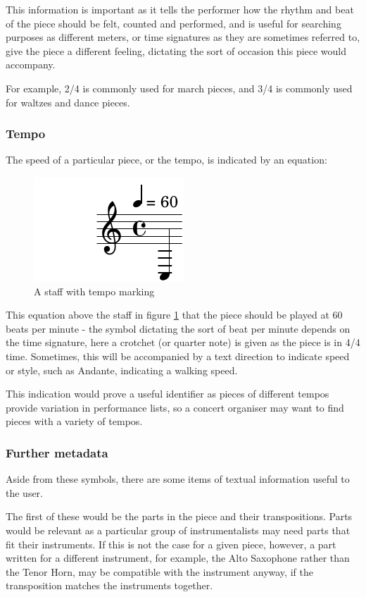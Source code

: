 This information is important as it tells the performer how the rhythm and beat of the piece should be felt, counted and performed, and is useful for searching purposes as different meters, or time signatures as they are sometimes referred to, give the piece a different feeling, dictating the sort of occasion this piece would accompany. 

For example, 2/4 is commonly used for march pieces, and 3/4 is commonly used for waltzes and dance pieces.

\subsubsection{Tempo}
The speed of a particular piece, or the tempo, is indicated by an equation:

\begin{figure}[htbp]
    \centering
        \includegraphics{tempo-crop.pdf}
    \caption{A staff with tempo marking}
    \label{fig:tempo}
\end{figure}

This equation above the staff in figure \ref{fig:tempo} that the piece should be played at 60 beats per minute - the symbol dictating the sort of beat per minute depends on the time signature, here a crotchet (or quarter note) is given as the piece is in 4/4 time. Sometimes, this will be accompanied by a text direction to indicate speed or style, such as Andante, indicating a walking speed.

This indication would prove a useful identifier as pieces of different tempos provide variation in performance lists, so a concert organiser may want to find pieces with a variety of tempos.

\subsubsection{Further metadata}
Aside from these symbols, there are some items of textual information useful to the user. 

The first of these would be the parts in the piece and their transpositions. Parts would be relevant as a particular group of instrumentalists may need parts that fit their instruments. If this is not the case for a given piece, however, a part written for a different instrument, for example, the Alto Saxophone rather than the Tenor Horn, may be compatible with the instrument anyway, if the transposition matches the instruments together. 

